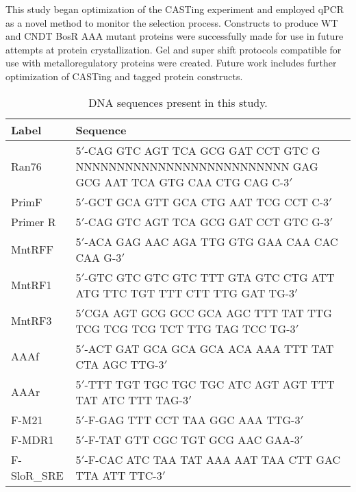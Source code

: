 \documentclass[12pt,twoside]{reedthesis}
\begin{document}
  		 
  		 
 This study began optimization of the CASTing experiment and employed qPCR as a novel method to monitor the selection process. Constructs to produce WT and CNDT BosR AAA mutant proteins were successfully made for use in future attempts at protein crystallization. Gel and super shift protocols compatible for use with metalloregulatory proteins were created. Future work includes further optimization of CASTing and tagged protein constructs. 
   
\appendix

 
 \begin{table}[!hp]
 	\caption[Relevant DNA Sequences]{DNA sequences present in this study.} 
 	\label{DNAsequences}
 	\begin{tabular}{|l | p{12cm}|}
 		\hline
 		Label & Sequence \\
 		\hline
 		Ran76 &5$'$-CAG GTC AGT TCA GCG GAT CCT GTC G NNNNNNNNNNNNNNNNNNNNNNNNNN GAG GCG AAT TCA GTG 
 		CAA CTG CAG C-3$'$ \\
 		\hline
 		PrimF & 5$'$-GCT GCA GTT GCA CTG AAT TCG CCT C-3$'$  \\ 
 		\hline
 		Primer R  & 5$'$-CAG GTC AGT TCA GCG GAT CCT GTC G-3$'$ \\  			
 		\hline
 		MntRFF & 5$'$-ACA GAG AAC AGA TTG GTG GAA CAA CAC CAA G-3$'$    \\
 		\hline
 		MntRF1  & 5$'$-GTC GTC GTC GTC TTT GTA GTC CTG ATT ATG TTC TGT TTT CTT TTG GAT TG-3$'$  \\ 
 		\hline
 		MntRF3 & 5$'$CGA AGT GCG GCC GCA AGC TTT TAT TTG TCG TCG TCG TCT TTG TAG TCC TG-3$'$  \\  
 		\hline
 		AAAf & 5$'$-ACT GAT GCA GCA GCA ACA AAA TTT TAT CTA AGC TTG-3$'$  \\     
 		\hline
 		AAAr & 5$'$-TTT TGT TGC TGC TGC ATC AGT AGT TTT TAT ATC TTT TAG-3$'$ \\
 		\hline
 		F-M21 & 5$'$-F-GAG TTT CCT TAA GGC AAA TTG-3$'$  \\
 		\hline
 		F-MDR1 & 5$'$-F-TAT GTT CGC TGT GCG AAC GAA-3$'$ \\  
 		\hline
 		F-SloR\_SRE & 5$'$-F-CAC ATC TAA TAT AAA AAT TAA CTT GAC TTA ATT TTC-3$'$  \\
 		\hline
 	\end{tabular}
 \end{table}

   
\end{document}
